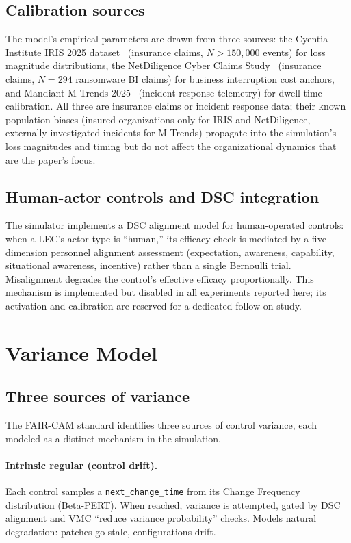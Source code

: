 \documentclass[11pt,a4paper]{article}
\begin{document}
\subsection{Calibration sources}
\label{sec:dataprovenance}

The model's empirical parameters are drawn from three sources: the Cyentia Institute IRIS 2025 dataset~\citep{IRIS2025} (insurance claims, $N{>}150{,}000$ events) for loss magnitude distributions, the NetDiligence Cyber Claims Study~\citep{NetDiligence2024} (insurance claims, $N{=}294$ ransomware BI claims) for business interruption cost anchors, and Mandiant M-Trends 2025~\citep{MTrends2025} (incident response telemetry) for dwell time calibration. All three are insurance claims or incident response data; their known population biases (insured organizations only for IRIS and NetDiligence, externally investigated incidents for M-Trends) propagate into the simulation's loss magnitudes and timing but do not affect the organizational dynamics that are the paper's focus.

\subsection{Human-actor controls and DSC integration}

The simulator implements a DSC alignment model for human-operated controls: when a LEC's actor type is ``human,'' its efficacy check is mediated by a five-dimension personnel alignment assessment (expectation, awareness, capability, situational awareness, incentive) rather than a single Bernoulli trial. Misalignment degrades the control's effective efficacy proportionally. This mechanism is implemented but disabled in all experiments reported here; its activation and calibration are reserved for a dedicated follow-on study.


\section{Variance Model}
\label{sec:variance}

\subsection{Three sources of variance}

The FAIR-CAM standard identifies three sources of control variance, each modeled as a distinct mechanism in the simulation.

\paragraph{Intrinsic regular (control drift).} Each control samples a \texttt{next\_change\_time} from its Change Frequency distribution (Beta-PERT). When reached, variance is attempted, gated by DSC alignment and VMC ``reduce variance probability'' checks. Models natural degradation: patches go stale, configurations drift.
\end{document}
